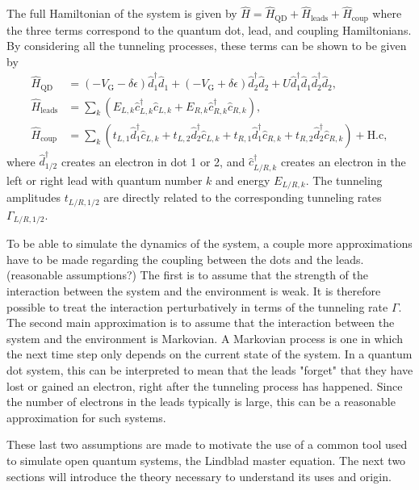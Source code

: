 \documentclass[../main.tex]{subfiles}
\begin{document}
The full Hamiltonian of the system is given by $\hat H = \hat H_\text{QD} + \hat H_\text{leads} + \hat H_\text{coup}$ where the three terms correspond to the quantum dot, lead, and coupling Hamiltonians. By considering all the tunneling processes, these terms can be shown to be given by
\begin{equation}
    \begin{aligned}
        \hat H_\text{QD} &= (-V_\text{G} - \delta\epsilon) \hat d_1^\dag \hat d_1  +  (-V_\text{G} + \delta\epsilon)\hat d_2^\dag \hat d_2 + U\hat d_1^\dag \hat d_1 \hat d_2^\dag \hat d_2, \\
        \hat H_\text{leads} &= \sum_{k} (E_{L,k} \hat c_{L,k}^\dag \hat c_{L,k}  + E_{R,k} \hat c_{R,k}^\dag \hat c_{R,k}), \\
        \hat H_\text{coup} &= \sum_k (t_{L,1} \hat d_1^\dag \hat c_{L,k} + t_{L,2} \hat d_2^\dag \hat c_{L,k} + t_{R,1} \hat d_1^\dag \hat c_{R,k} + t_{R,2} \hat d_2^\dag \hat c_{R,k}) + \text{H.c},
    \end{aligned}
\end{equation}
where $\hat d_{1/2}^\dag$ creates an electron in dot 1 or 2, and $\hat c_{L/R,k}^\dag$ creates an electron in the left or right lead with quantum number $k$ and energy $E_{L/R,k}$. The tunneling amplitudes $t_{L/R,1/2}$ are directly related to the corresponding tunneling rates $\Gamma_{L/R,1/2}$. 

To be able to simulate the dynamics of the system, a couple more approximations have to be made regarding the coupling between the dots and the leads. (reasonable assumptions?) The first is to assume that the strength of the interaction between the system and the environment is weak. It is therefore possible to treat the interaction perturbatively in terms of the tunneling rate $\Gamma$. The second main approximation is to assume that the interaction between the system and the environment is Markovian. A Markovian process is one in which the next time step only depends on the current state of the system. In a quantum dot system, this can be interpreted to mean that the leads "forget" that they have lost or gained an electron, right after the tunneling process has happened. Since the number of electrons in the leads typically is large, this can be a reasonable approximation for such systems.

These last two assumptions are made to motivate the use of a common tool used to simulate open quantum systems, the Lindblad master equation. The next two sections will introduce the theory necessary to understand its uses and origin.
\end{document}
